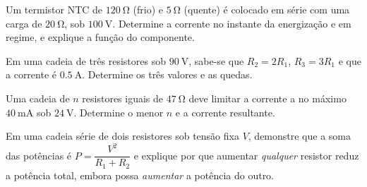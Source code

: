 \begin{questao}[3]{}

Um termistor NTC de $\SI{120}{\ohm}$ (frio) e $\SI{5}{\ohm}$ (quente) é
colocado em série com uma carga de $\SI{20}{\ohm}$, sob $\SI{100}{\volt}$.
Determine a corrente no instante da energização e em regime, e explique a
função do componente.


\end{questao}
\begin{questao}[3]{}

Em uma cadeia de três resistores sob $\SI{90}{\volt}$, sabe-se que
$R_2=2R_1$, $R_3=3R_1$ e que a corrente é $\SI{0.5}{\ampere}$. Determine os
três valores e as quedas.


\end{questao}
\begin{questao}[3]{}

Uma cadeia de $n$ resistores iguais de $\SI{47}{\ohm}$ deve limitar a corrente
a no máximo $\SI{40}{\milli\ampere}$ sob $\SI{24}{\volt}$. Determine o menor
$n$ e a corrente resultante.


\end{questao}
\begin{questao}[3]{}

Em uma cadeia série de dois resistores sob tensão fixa $V$, demonstre que a
soma das potências é $P=\dfrac{V^{2}}{R_1+R_2}$ e explique por que aumentar
\emph{qualquer} resistor reduz a potência total, embora possa \emph{aumentar} a
potência do outro.


\end{questao}

